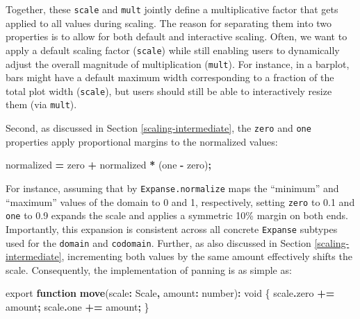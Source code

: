 \documentclass[
  openany]{book}
\newenvironment{Shaded}{\begin{snugshade}}{\end{snugshade}}
\newcommand{\AttributeTok}[1]{\textcolor[rgb]{0.13,0.29,0.53}{#1}}
\newcommand{\DataTypeTok}[1]{\textcolor[rgb]{0.13,0.29,0.53}{#1}}
\newcommand{\FunctionTok}[1]{\textcolor[rgb]{0.13,0.29,0.53}{\textbf{#1}}}
\newcommand{\ImportTok}[1]{#1}
\newcommand{\KeywordTok}[1]{\textcolor[rgb]{0.13,0.29,0.53}{\textbf{#1}}}
\newcommand{\NormalTok}[1]{#1}
\newcommand{\OperatorTok}[1]{\textcolor[rgb]{0.81,0.36,0.00}{\textbf{#1}}}
\theoremstyle{definition}
\theoremstyle{definition}
\theoremstyle{definition}
\theoremstyle{definition}
\theoremstyle{remark}
\begin{document}
Together, these \texttt{scale} and \texttt{mult} jointly define a multiplicative factor that gets applied to all values during scaling. The reason for separating them into two properties is to allow for both default and interactive scaling. Often, we want to apply a default scaling factor (\texttt{scale}) while still enabling users to dynamically adjust the overall magnitude of multiplication (\texttt{mult}). For instance, in a barplot, bars might have a default maximum width corresponding to a fraction of the total plot width (\texttt{scale}), but users should still be able to interactively resize them (via \texttt{mult}).

Second, as discussed in Section \ref{scaling-intermediate}, the \texttt{zero} and \texttt{one} properties apply proportional margins to the normalized values:

\begin{Shaded}
\begin{Highlighting}[]
\NormalTok{normalized }\OperatorTok{=}\NormalTok{ zero }\OperatorTok{+}\NormalTok{ normalized }\OperatorTok{*}\NormalTok{ (one }\OperatorTok{{-}}\NormalTok{ zero)}\OperatorTok{;}
\end{Highlighting}
\end{Shaded}

For instance, assuming that by \texttt{Expanse.normalize} maps the ``minimum'' and ``maximum'' values of the domain to 0 and 1, respectively, setting \texttt{zero} to 0.1 and \texttt{one} to 0.9 expands the scale and applies a symmetric 10\% margin on both ends. Importantly, this expansion is consistent across all concrete \texttt{Expanse} subtypes used for the \texttt{domain} and \texttt{codomain}. Further, as also discussed in Section \ref{scaling-intermediate}, incrementing both values by the same amount effectively shifts the scale. Consequently, the implementation of panning is as simple as:

\begin{Shaded}
\begin{Highlighting}[]
\ImportTok{export} \KeywordTok{function} \FunctionTok{move}\NormalTok{(scale}\OperatorTok{:}\NormalTok{ Scale}\OperatorTok{,}\NormalTok{ amount}\OperatorTok{:} \DataTypeTok{number}\NormalTok{)}\OperatorTok{:} \DataTypeTok{void}\NormalTok{ \{}
\NormalTok{  scale}\OperatorTok{.}\AttributeTok{zero} \OperatorTok{+=}\NormalTok{ amount}\OperatorTok{;}
\NormalTok{  scale}\OperatorTok{.}\AttributeTok{one} \OperatorTok{+=}\NormalTok{ amount}\OperatorTok{;}
\NormalTok{\}}
\end{Highlighting}
\end{Shaded}
\end{document}
